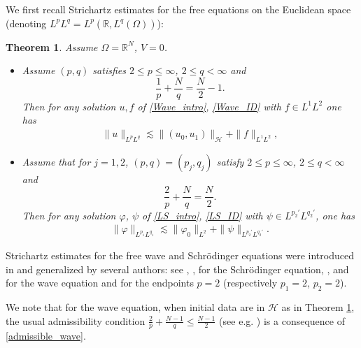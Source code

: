 \documentclass[10pt,leqno]{amsart}
\newtheorem{exttheo}{Theorem}
\theoremstyle{definition}%
\theoremstyle{remark}
\numberwithin{equation}{section}
\newcommand{\R}{\mathbb{R}}
\renewcommand{\^}{\widehat}%
\newcommand{\HHH}{\mathcal{H}}
\begin{document}
We first recall Strichartz estimates for the free equations on the Euclidean space (denoting $L^pL^q=L^p(\R,L^q(\Omega))$):
\begin{exttheo}
\label{T:free_Strichartz}
Assume $\Omega=\R^N$, $V=0$. 
\begin{itemize}
 \item 
Assume $(p,q)$ satisfies $2\leq p\leq \infty$, $2\leq q<\infty$ and 
\begin{equation}
\label{admissible_wave}
 \frac{1}{p}+\frac{N}{q}=\frac{N}{2}-1.
\end{equation}
Then for any solution $u,f$ of \eqref{Wave_intro}, \eqref{Wave_ID} with $f\in L^1L^2$ one has
\begin{gather}
\label{StrichartzWave}
 \|u\|_{L^pL^q}\lesssim \|(u_0,u_1)\|_{\mathcal{H}}+\|f\|_{L^1L^2},
\end{gather}
\item Assume that for $j=1,2$, $(p,q)=(p_j,q_j)$ satisfy $2\leq p\leq \infty$, $2\leq q<\infty$ and 
\begin{equation}
 \label{admissible_LS}
 \frac{2}{p}+\frac{N}{q}=\frac{N}{2}.
\end{equation} 
Then for any solution $\varphi$, $\psi$ of \eqref{LS_intro}, \eqref{LS_ID} with $\psi\in L^{p_2'}L^{q_2'}$, one has
\begin{gather}
\label{StrichartzLS}
 \|\varphi\|_{L^{p_1}L^{q_1}}\lesssim \|\varphi_0\|_{L^2}+\|\psi\|_{L^{p_2'}L^{q_2'}}.
\end{gather}
\end{itemize}
\end{exttheo}


Strichartz estimates for the free wave and Schr\"odinger equations were introduced in \cite{St77a} and generalized by several authors: see \cite{GiVe85}, \cite{Yajima87}, \cite{CaWe88} for the Schr\"odinger equation, \cite{Kapitanski90}, \cite{GiVe95} and \cite{LiSo95} for the wave equation and \cite{KeTa98} for the endpoints $p=2$ (respectively $p_1=2$, $p_2=2$).

We note that for the wave equation, when initial data are in $\HHH$ as in Theorem \ref{T:free_Strichartz}, the usual admissibility condition $\frac{2}{p}+\frac{N-1}{q}\leq \frac{N-1}{2}$ (see e.g. \cite[Definition 1.1]{KeTa98}) is a consequence of \eqref{admissible_wave}.
\end{document}
